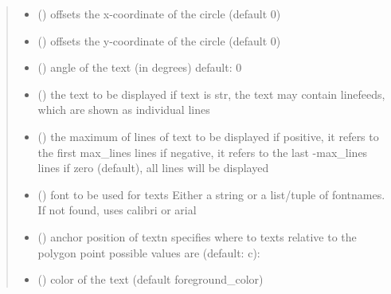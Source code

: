\documentclass[letterpaper,10pt,english]{sphinxmanual}
\begin{document}
\begin{fulllineitems}
\begin{quote}
\begin{description}
\begin{itemize}
\item {} 
 () \textendash{} offsets the x-coordinate of the circle (default 0)

\item {} 
 () \textendash{} offsets the y-coordinate of the circle (default 0)

\item {} 
 () \textendash{} angle of the text (in degrees) 
default: 0

\item {} 
 (\sphinxstyleliteralemphasis{\sphinxupquote{, }}) \textendash{} the text to be displayed 
if text is str, the text may contain linefeeds, which are shown as individual lines

\item {} 
 () \textendash{} the maximum of lines of text to be displayed 
if positive, it refers to the first max\_lines lines 
if negative, it refers to the last -max\_lines lines 
if zero (default), all lines will be displayed

\item {} 
 () \textendash{} font to be used for texts 
Either a string or a list/tuple of fontnames.
If not found, uses calibri or arial

\item {} 
 () \textendash{} anchor position of text\textbar{}n\textbar{}
specifies where to texts relative to the polygon
point 
possible values are (default: c): 

\item {} 
 () \textendash{} color of the text (default foreground\_color)


\end{itemize}
\end{description}
\end{quote}
\end{fulllineitems}
\end{document}
